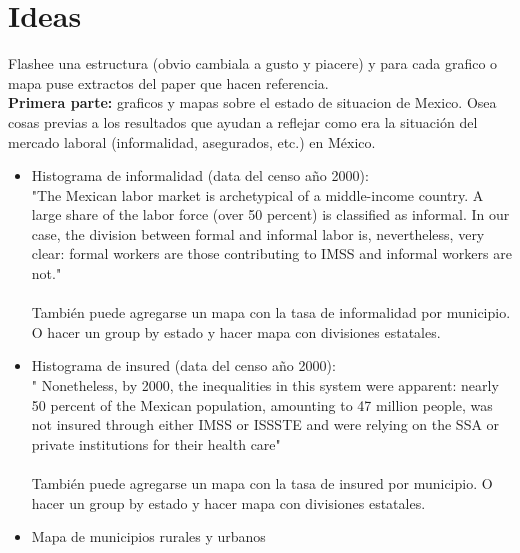 \section*{Ideas}

Flashee una estructura (obvio cambiala a gusto y piacere) y para cada grafico o mapa puse extractos del paper que hacen referencia. 
\\

\textbf{Primera parte:} graficos y mapas sobre el estado de situacion de Mexico. Osea cosas previas a los resultados que ayudan a reflejar como era la situación del mercado laboral (informalidad, asegurados, etc.) en México. 

\begin{itemize}
    \item Histograma de informalidad (data del censo año 2000): \\"The Mexican labor market is archetypical of a middle-income country. A large share of the labor force (over 50 percent) is classified as informal. In our case, the division between formal and informal labor is, nevertheless, very clear: formal workers are those contributing to IMSS and informal workers are not." \\
    \\También puede agregarse un mapa con la tasa de informalidad por municipio. O hacer un group by estado y hacer mapa con divisiones estatales. 
    \item Histograma de insured (data del censo año 2000):\\" Nonetheless, by 2000, the inequalities in this system were apparent: nearly 50 percent of the Mexican population, amounting to 47 million people, was not insured through either IMSS or ISSSTE and were relying on the SSA or private institutions for their health care"\\
   \\ También puede agregarse un mapa con la tasa de insured por municipio.  O hacer un group by estado y hacer mapa con divisiones estatales. 
    \item Mapa de municipios rurales y urbanos 
\end{itemize}

